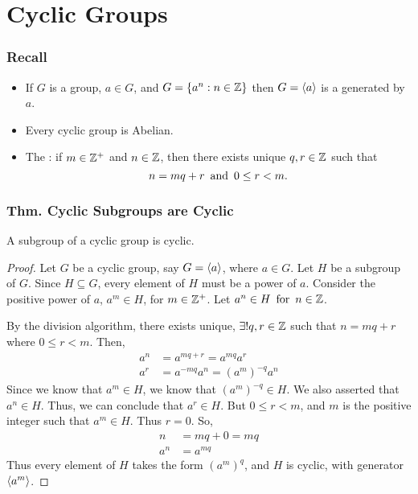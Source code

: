\section{Cyclic Groups}

\subsubsection*{Recall}
\begin{itemize}
    \item If $G$ is a group, $a \in G$, and $G = \{a^n : n \in \mathbb{Z}\}$ then $G = \langle a \rangle$ is a  generated by $a$.
    \item Every cyclic group is Abelian.
    \item The : if $m \in \mathbb{Z}^+$ and $n \in \mathbb{Z}$, then there exists unique $q,r \in \mathbb{Z}$ such that
    \[
        n = mq + r \operatorname{~\text{and}~} 0 \leq r < m.
    \]
\end{itemize}

\subsubsection{Thm. Cyclic Subgroups are Cyclic}
A subgroup of a cyclic group is cyclic.
\begin{proof}
    Let $G$ be a cyclic group, say $G = \langle a \rangle$, where $a \in G$. Let $H$ be a subgroup of $G$. Since $H \subseteq G$, every element of $H$ must be a power of $a$. Consider the  positive power of $a$, $a^m \in H$, for $m \in \mathbb{Z}^+$. Let $a^n \in H \operatorname{~\text{for}~} n \in \mathbb{Z}$.

    By the division algorithm, there exists unique, $\exists! q,r \in \mathbb{Z}$ such that $n = mq+r$ where $0 \leq r < m$. Then,
    \begin{align*}
        a^n & = a^{mq+r} = a^{mq}a^r \\
        a^r & = a^{-mq}a^n = (a^m)^{-q}a^n
    \end{align*}
    Since we know that $a^m \in H$, we know that $(a^m)^{-q} \in H$. We also asserted that $a^n \in H$. Thus, we can conclude that $a^r \in H$. But $0 \leq r < m$, and $m$ is the  positive integer such that $a^m \in H$. Thus $r = 0$. So,
    \begin{align*}
        n & = mq + 0 = mq \\
        a^n & = a^{mq}
    \end{align*}
    Thus every element of $H$ takes the form $(a^m)^q$, and $H$ is cyclic, with generator $\langle a^m \rangle$.
\end{proof}

